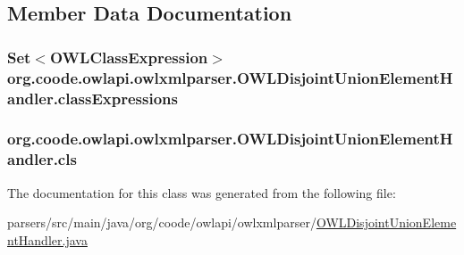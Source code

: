 \subsection{Member Data Documentation}
\hypertarget{classorg_1_1coode_1_1owlapi_1_1owlxmlparser_1_1_o_w_l_disjoint_union_element_handler_ae670082f84679181406bf54588a4fed2}{
\subsubsection[{class\-Expressions}]{\setlength{\rightskip}{0pt plus 5cm}Set$<${\bf O\-W\-L\-Class\-Expression}$>$ org.\-coode.\-owlapi.\-owlxmlparser.\-O\-W\-L\-Disjoint\-Union\-Element\-Handler.\-class\-Expressions\hspace{0.3cm}{\ttfamily [private]}}}\label{classorg_1_1coode_1_1owlapi_1_1owlxmlparser_1_1_o_w_l_disjoint_union_element_handler_ae670082f84679181406bf54588a4fed2}
\hypertarget{classorg_1_1coode_1_1owlapi_1_1owlxmlparser_1_1_o_w_l_disjoint_union_element_handler_a52967262d96f703fde6b00b1bc14ad22}{
\subsubsection[{cls}]{ org.\-coode.\-owlapi.\-owlxmlparser.\-O\-W\-L\-Disjoint\-Union\-Element\-Handler.\-cls\hspace{0.3cm}{\ttfamily [private]}}}\label{classorg_1_1coode_1_1owlapi_1_1owlxmlparser_1_1_o_w_l_disjoint_union_element_handler_a52967262d96f703fde6b00b1bc14ad22}


The documentation for this class was generated from the following file\-:\begin{DoxyCompactItemize}
\item 
parsers/src/main/java/org/coode/owlapi/owlxmlparser/\hyperlink{_o_w_l_disjoint_union_element_handler_8java}{O\-W\-L\-Disjoint\-Union\-Element\-Handler.\-java}\end{DoxyCompactItemize}
